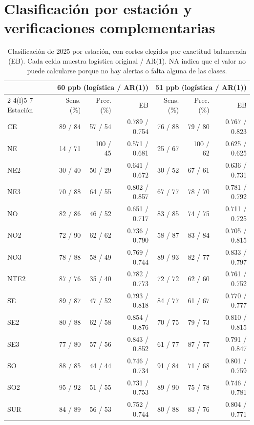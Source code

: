 \documentclass[11pt,letterpaper]{article}
\begin{document}
\section{Clasificación por estación y verificaciones complementarias}\label{anexo:clasificacion}
\begin{table}[!htbp]\centering\scriptsize
\begin{tabular}{@{}lrrrrrr@{}}
\toprule
 & \multicolumn{3}{c}{60 ppb (logística / AR(1))} & \multicolumn{3}{c}{51 ppb (logística / AR(1))} \\
\cmidrule(lr){2-4}\cmidrule(l){5-7}
Estación & Sens. (\%) & Prec. (\%) & EB & Sens. (\%) & Prec. (\%) & EB \\
\midrule
CE & 89 / 84 & 57 / 54 & 0.789 / 0.754 & 76 / 88 & 79 / 80 & 0.767 / 0.823 \\
NE & 14 / 71 & 100 / 45 & 0.571 / 0.681 & 25 / 67 & 100 / 62 & 0.625 / 0.625 \\
NE2 & 30 / 40 & 50 / 29 & 0.641 / 0.672 & 30 / 52 & 67 / 61 & 0.636 / 0.731 \\
NE3 & 70 / 88 & 64 / 55 & 0.802 / 0.857 & 67 / 77 & 78 / 70 & 0.781 / 0.792 \\
NO & 82 / 86 & 46 / 52 & 0.651 / 0.717 & 83 / 85 & 74 / 75 & 0.711 / 0.725 \\
NO2 & 72 / 90 & 62 / 62 & 0.736 / 0.790 & 58 / 87 & 83 / 84 & 0.705 / 0.815 \\
NO3 & 78 / 88 & 58 / 49 & 0.769 / 0.744 & 89 / 93 & 82 / 77 & 0.833 / 0.797 \\
NTE2 & 87 / 76 & 35 / 40 & 0.782 / 0.773 & 72 / 72 & 62 / 60 & 0.761 / 0.752 \\
SE & 89 / 87 & 47 / 52 & 0.793 / 0.818 & 84 / 77 & 61 / 67 & 0.770 / 0.777 \\
SE2 & 80 / 88 & 62 / 58 & 0.854 / 0.876 & 70 / 75 & 79 / 73 & 0.810 / 0.815 \\
SE3 & 77 / 80 & 57 / 56 & 0.843 / 0.852 & 61 / 77 & 87 / 77 & 0.791 / 0.847 \\
SO & 88 / 85 & 44 / 44 & 0.746 / 0.734 & 91 / 84 & 71 / 68 & 0.801 / 0.759 \\
SO2 & 95 / 92 & 51 / 55 & 0.731 / 0.753 & 89 / 90 & 75 / 78 & 0.746 / 0.781 \\
SUR & 84 / 89 & 56 / 53 & 0.752 / 0.744 & 80 / 88 & 83 / 76 & 0.804 / 0.771 \\
\bottomrule
\end{tabular}

\caption{Clasificación de 2025 por estación, con cortes elegidos por exactitud balanceada (EB). Cada celda muestra logística original / AR(1). NA indica que el valor no puede calcularse porque no hay alertas o falta alguna de las clases.}\label{tab:ar1estaciones}
\end{table}
\end{document}
